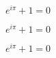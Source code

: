 \documentclass{article}
\begin{document}

\begin{displaymath} e^{i\pi} +1 = 0 \end{displaymath}

$$ e^{i\pi} + 1 = 0 $$

\[e^{i\pi} + 1 = 0\]
\end{document}
